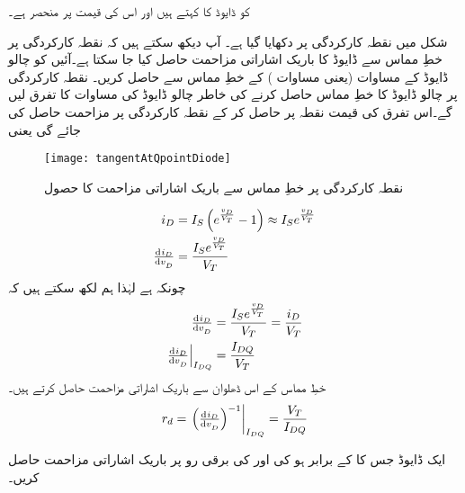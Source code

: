  کو ڈایوڈ کا   کہتے ہیں اور اس کی قیمت  پر منحصر ہے۔

شکل   میں نقطہ کارکردگی پر   دکھایا گیا ہے۔ آپ دیکھ سکتے ہیں کہ نقطہ کارکردگی پر خطِ مماس  سے ڈایوڈ کا باریک اشاراتی مزاحمت   حاصل کیا جا سکتا ہے۔آئیں   کو چالو ڈایوڈ کے مساوات (یعنی مساوات  ) کے خطِ مماس سے حاصل کریں۔ نقطہ کارکردگی پر چالو ڈایوڈ کا خطِ مماس حاصل کرنے کی خاطر چالو ڈایوڈ کی مساوات کا تفرق  لیں گے۔اس تفرق کی قیمت نقطہ  پر حاصل کر کے نقطہ کارکردگی پر مزاحمت   حاصل کی جائے گی یعنی
\begin{figure}
\centering
\texttt{[image: tangentAtQpointDiode]}
\caption{ نقطہ کارکردگی پر خطِ مماس سے باریک اشاراتی مزاحمت کا حصول}
\label{شکل_ڈایوڈ_نقطہ_کارکردگی_پر_مماس}
\end{figure}
%
\begin{gather}
\begin{aligned}[t]
i_D &=I_S \left (e^{\frac{v_D}{V_T}}-1 \right ) \approx I_S e^{\frac{v_D}{V_T}}\\
\od{i_D}{v_D}&=\frac{I_S e^{\frac{v_D}{V_T}}}{V_T}
\end{aligned}
\end{gather}
چونکہ    ہے لہٰذا ہم لکھ سکتے ہیں کہ 
\begin{gather}
\begin{aligned}[t]
\od{i_D}{v_D}&=\frac{I_S e^{\frac{v_D}{V_T}}}{V_T}=\frac{i_D}{V_T}\\
\left . \od{i_D}{v_D} \right |_{I_{DQ}}&=\frac{I_{DQ}}{V_T}
\end{aligned}
\end{gather}
خطِ مماس کے اس ڈھلوان سے باریک اشاراتی مزاحمت حاصل کرتے ہیں۔
\begin{align} \label{مساوات_ڈایوڈ_کی_مزاحمت_کا_رو_سے_حصول}
r_d = \left . \left(\od{i_D}{v_D} \right )^{-1} \right|_{I_{DQ}}=\frac{V_T}{I_{DQ}}
\end{align}

ایک ڈایوڈ جس کا  کے برابر ہو کی     اور   کی برقی رو پر باریک اشاراتی مزاحمت حاصل کریں۔

